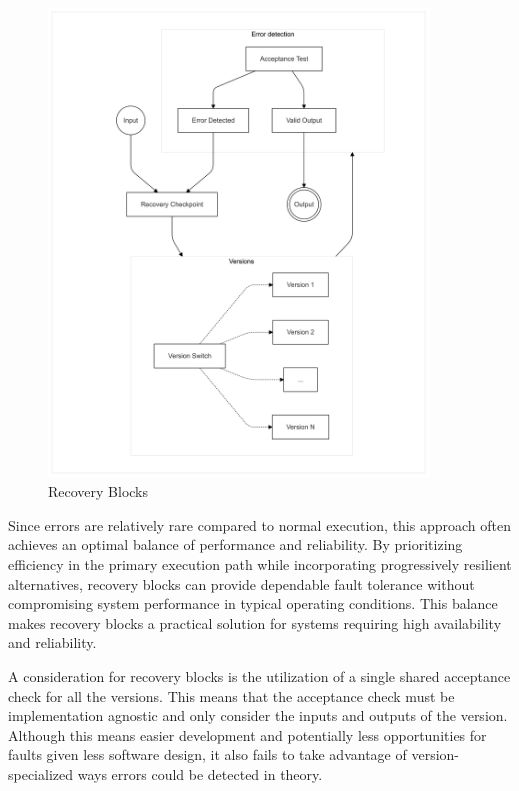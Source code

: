 \documentclass[12pt, letterpaper]{article}
\begin{document}
\begin{figure}[hbt!]
    \centering
    \includegraphics[width=0.9\textwidth]{recovery_blocks/recovery_blocks_01.png}
    \caption{Recovery Blocks}
    \label{fig:rec_blo}
\end{figure}

\break

Since errors are relatively rare compared to normal execution, this approach often achieves an optimal balance of performance and reliability. By prioritizing efficiency in the primary execution path while incorporating progressively resilient alternatives, recovery blocks can provide dependable fault tolerance without compromising system performance in typical operating conditions. This balance makes recovery blocks a practical solution for systems requiring high availability and reliability.

A consideration for recovery blocks is the utilization of a single shared acceptance check for all the versions. This means that the acceptance check must be implementation agnostic and only consider the inputs and outputs of the version. Although this means easier development and potentially less opportunities for faults given less software design, it also fails to take advantage of version-specialized ways errors could be detected in theory.
\end{document}
